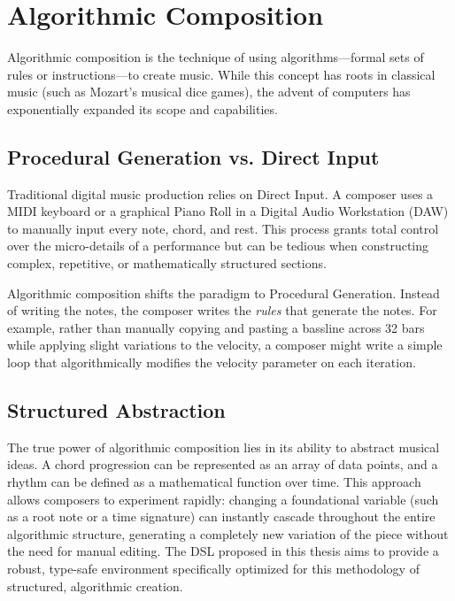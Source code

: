 \section{Algorithmic Composition}\label{sec:background-algorithmic-composition}

Algorithmic composition is the technique of using algorithms—formal sets of rules or instructions—to create music.
While this concept has roots in classical music (such as Mozart's musical dice games), the advent of
computers has exponentially expanded its scope and capabilities.

\subsection{Procedural Generation vs. Direct Input}

Traditional digital music production relies on Direct Input.
A composer uses a MIDI keyboard or a graphical Piano Roll in a Digital Audio Workstation (DAW) to manually
input every note, chord, and rest.
This process grants total control over the micro-details of a performance but can be tedious when
constructing complex, repetitive, or mathematically structured sections.

Algorithmic composition shifts the paradigm to Procedural Generation.
Instead of writing the notes, the composer writes the \textit{rules} that generate the notes.
For example, rather than manually copying and pasting a bassline across 32 bars while applying slight
variations to the velocity, a composer might write a simple loop that algorithmically modifies the velocity
parameter on each iteration.

\subsection{Structured Abstraction}

The true power of algorithmic composition lies in its ability to abstract musical ideas.
A chord progression can be represented as an array of data points, and a rhythm can be defined as a
mathematical function over time.
This approach allows composers to experiment rapidly: changing a foundational variable (such as a root note
or a time signature) can instantly cascade throughout the entire algorithmic structure, generating a
completely new variation of the piece without the need for manual editing.
The DSL proposed in this thesis aims to provide a robust, type-safe environment specifically optimized for
this methodology of structured, algorithmic creation.
